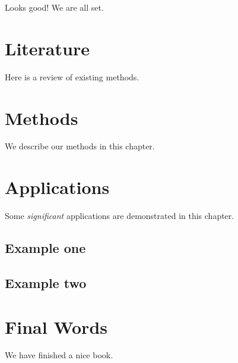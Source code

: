 \documentclass[]{book}
\begin{document}
Looks good! We are all set.

\chapter{Literature}\label{literature}

Here is a review of existing methods.

\chapter{Methods}\label{methods}

We describe our methods in this chapter.

\chapter{Applications}\label{applications}

Some \emph{significant} applications are demonstrated in this chapter.

\section{Example one}\label{example-one}

\section{Example two}\label{example-two}

\chapter{Final Words}\label{final-words}

We have finished a nice book.


\end{document}
